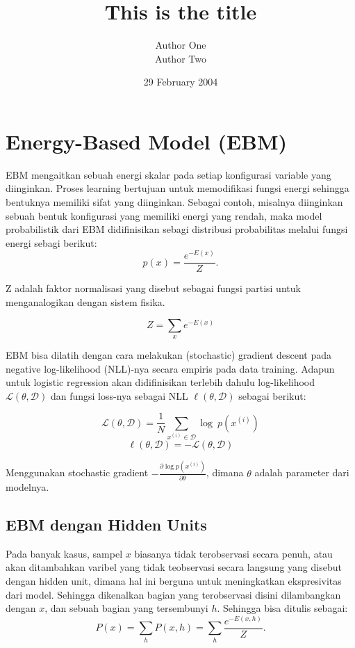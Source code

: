 \documentclass[12pt]{article}
\title{This is the title}
\author{Author One \\ Author Two}
\date{29 February 2004}
\begin{document}
\maketitle


\section{Energy-Based Model (EBM)}
EBM mengaitkan sebuah energi skalar pada setiap konfigurasi variable yang diinginkan. Proses learning bertujuan untuk memodifikasi fungsi energi sehingga bentuknya memiliki  sifat yang diinginkan. Sebagai contoh, misalnya diinginkan sebuah bentuk konfigurasi yang memiliki energi yang rendah, maka model probabilistik dari EBM didifinisikan sebagi distribusi probabilitas melalui fungsi energi sebagi berikut:
\begin{equation}
p(x) = \frac {e^{-E(x)}} {Z}.
\end{equation}

Z adalah faktor normalisasi yang disebut sebagai fungsi partisi untuk menganalogikan dengan sistem fisika.

\[Z = \sum_x e^{-E(x)}\]

EBM bisa dilatih dengan cara melakukan (stochastic) gradient descent pada negative log-likelihood (NLL)-nya secara empiris pada data training. Adapun untuk logistic regression akan didifinisikan terlebih dahulu log-likelihood $\mathcal{L}(\theta, \mathcal{D})$ dan fungsi loss-nya sebagai NLL $\ell (\theta, \mathcal{D})$ sebagai berikut:

\[\mathcal{L}(\theta, \mathcal{D}) = \frac{1}{N} \sum_{x^{(i)} \in
\mathcal{D}} \log\ p(x^{(i)})\]
\[\ell (\theta, \mathcal{D}) = - \mathcal{L} (\theta, \mathcal{D})
\]

Menggunakan stochastic gradient $-\frac{\partial  \log p(x^{(i)})}{\partial
\theta}$, dimana $\theta$ adalah parameter dari modelnya.

\subsection{EBM dengan Hidden Units}

Pada banyak kasus, sampel $x$ biasanya tidak terobservasi secara penuh, atau akan ditambahkan varibel yang tidak teobservasi secara langsung yang disebut dengan hidden unit, dimana hal ini berguna untuk meningkatkan ekspresivitas dari model. Sehingga dikenalkan bagian yang terobservasi disini dilambangkan dengan $x$, dan sebuah bagian yang tersembunyi $h$. Sehingga bisa ditulis sebagai:
\begin{equation}
P(x) = \sum_h P(x,h) = \sum_h \frac{e^{-E(x,h)}}{Z}.
\end{equation}
\end{document}

